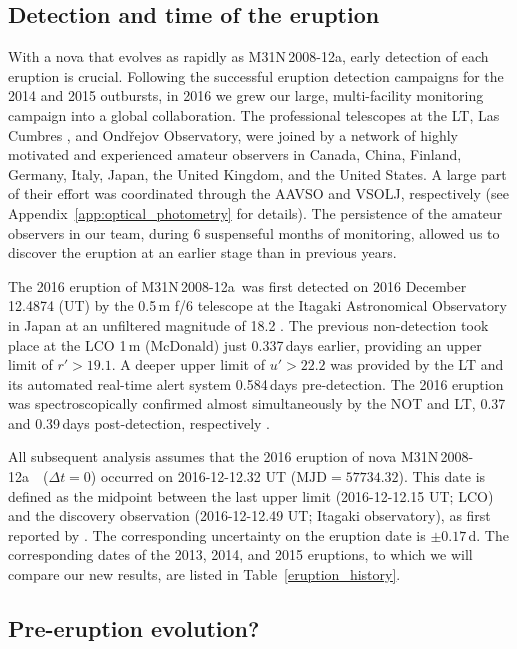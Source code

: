 \documentclass[twocolumn,tighten]{aastex6}
\def\nova{{M31N\,2008-12a~}}
\def\novak{{M31N\,2008-12a}}
\begin{document}
\subsection{Detection and time of the eruption}\label{sec:time}

With a nova that evolves as rapidly as \novak, early detection of each eruption is crucial.  Following the successful eruption detection campaigns for the 2014 and 2015 outbursts, in 2016 we grew our large, multi-facility monitoring campaign into a global collaboration. The professional telescopes at the LT, Las Cumbres \citep[LCO;][the 2\,m at Haleakala, Hawai'i, the 1\,m at McDonald, Texas]{2013PASP..125.1031B}, and Ond\v{r}ejov Observatory, were joined by a network of highly motivated and experienced amateur observers in Canada, China, Finland, Germany, Italy, Japan, the United Kingdom, and the United States. A large part of their effort was coordinated through the AAVSO and VSOLJ, respectively (see Appendix~\ref{app:optical_photometry} for details). The persistence of the amateur observers in our team, during 6 suspenseful months of monitoring, allowed us to discover the eruption at an earlier stage than in previous years.

The 2016 eruption of \novak\ was first detected on 2016 December 12.4874 (UT) by the 0.5\,m f/6 telescope at the Itagaki Astronomical Observatory in Japan at an unfiltered magnitude of 18.2 \citep{2016Ita}. The previous non-detection took place at the LCO 1\,m (McDonald) just 0.337\,days earlier, providing an upper limit of $r'>19.1$.  A deeper upper limit of $u'>22.2$ was provided by the LT and its automated real-time alert system \citep[see][]{2007ApJ...661L..45D} 0.584\,days pre-detection.  The 2016 eruption was spectroscopically confirmed almost simultaneously by the NOT and LT, 0.37 and 0.39\,days post-detection, respectively \citep{2016ATel.9852....1D}.

All subsequent analysis assumes that the 2016 eruption of nova \nova\ ($\Delta t=0$) occurred on 2016-12-12.32 UT ($\mathrm{MJD}= 57734.32$). This date is defined as the midpoint between the last upper limit (2016-12-12.15 UT; LCO) and the discovery observation (2016-12-12.49 UT; Itagaki observatory), as first reported by \citet{2016ATel.9848....1I}. The corresponding uncertainty on the eruption date is $\pm0.17$\,d. The corresponding dates of the 2013, 2014, and 2015 eruptions, to which we will compare our new results, are listed in Table~\ref{eruption_history}.

\subsection{Pre-eruption evolution?}
\end{document}
